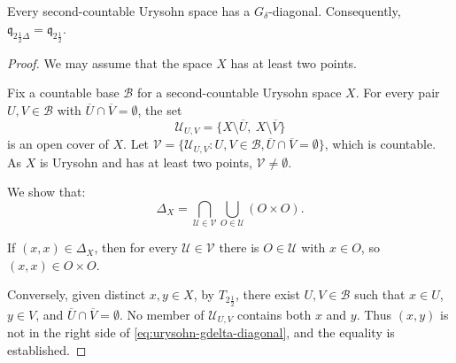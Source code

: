 \begin{lemma}\label{lem:second-countable-urysohn-gdelta-diagonal}
Every second-countable Urysohn space has a $G_\delta$-diagonal.
Consequently,
$\mathfrak q_{2\frac{1}{2}\Delta}=\mathfrak q_{2\frac{1}{2}}$.
\end{lemma}

\begin{proof}
We may assume that the space $X$ has at least two points.

Fix a countable base $\mathcal B$ for a second-countable Urysohn
space $X$. For every pair $U,V\in\mathcal B$ with
$\overline U\cap\overline V=\emptyset$, the set
\[
  \mathcal U_{U,V}=\{X\setminus\overline U,\ X\setminus\overline V\}
\]
is an open cover of $X$.
Let $\mathcal V=\{\mathcal U_{U,V}: U,V\in\mathcal B, \overline U\cap\overline V=\emptyset\}$, which is countable.
As $X$ is Urysohn and has at least two points, $\mathcal V\neq\emptyset$.

We show that:
\begin{equation}\label{eq:urysohn-gdelta-diagonal}
  \Delta_X=\bigcap_{\mathcal U\in\mathcal V}
    \bigcup_{O\in\mathcal U}(O\times O).
\end{equation}

If $(x,x)\in\Delta_X$, then for every $\mathcal U\in\mathcal V$ there is $O\in\mathcal U$ with $x\in O$, so $(x,x)\in O\times O$.

Conversely, given distinct $x,y\in X$, by $T_{2\frac{1}{2}}$, there exist $U,V\in\mathcal B$ such that $x\in U$, $y\in V$, and $\overline U\cap\overline V=\emptyset$. No member of $\mathcal U_{U,V}$ contains both $x$ and $y$.
Thus $(x, y)$ is not in the right side of \eqref{eq:urysohn-gdelta-diagonal}, and the equality is established.
\end{proof}
